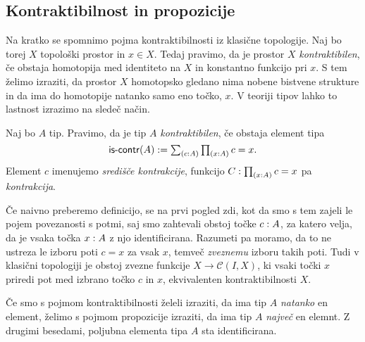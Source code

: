 \subsection{Kontraktibilnost in propozicije}
Na kratko se spomnimo pojma kontraktibilnosti iz klasične topologije. Naj bo torej \(X\) topološki prostor in \(x \in X\). Tedaj pravimo, da je prostor \(X\) \emph{kontraktibilen}, če obstaja homotopija med identiteto na \(X\) in konstantno funkcijo pri \(x\). S tem želimo izraziti, da prostor \(X\) homotopsko gledano nima nobene bistvene strukture in da ima do homotopije natanko samo eno točko, \(x\). V teoriji tipov lahko to lastnost izrazimo na sledeč način.
\begin{definicija}
  Naj bo \(A\) tip. Pravimo, da je tip \(A\) \emph{kontraktibilen}, če obstaja element tipa
  \[\textnormal{\textsf{is-contr}}(A) := \textstyle \sum_{\left( c : A \right)} \textstyle \prod_{\left( x : A \right)} c = x.\]
  Element \(c\) imenujemo \emph{središče kontrakcije}, funkcijo
  \(C : \textstyle \prod_{\left( x : A \right)} c = x\) pa \emph{kontrakcija}.
\end{definicija}
Če naivno preberemo definicijo, se na prvi pogled zdi, kot da smo s tem zajeli le pojem povezanosti s potmi, saj smo zahtevali obstoj točke \(c : A\), za katero velja, da je vsaka točka \(x : A\) z njo identificirana. Razumeti pa moramo, da to ne ustreza le izboru poti \(c = x\) za vsak \(x\), temveč \emph{zveznemu} izboru takih poti. Tudi v klasični topologiji je obstoj zvezne funkcije \(X \to \mathcal{C}(I, X)\), ki vsaki točki \(x\) priredi pot med izbrano točko \(c\) in \(x\), ekvivalenten kontraktibilnosti \(X\).

Če smo s pojmom kontraktibilnosti želeli izraziti, da ima tip \(A\) \emph{natanko} en element, želimo s pojmom propozicije izraziti, da ima tip \(A\) \emph{največ} en elemnt. Z drugimi besedami, poljubna elementa tipa \(A\) sta identificirana.

